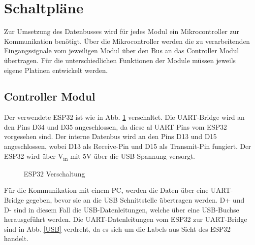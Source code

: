 \section{Schaltpläne}

Zur Umsetzung des Datenbusses wird für jedes Modul ein Mikrocontroller zur Kommunikation benötigt. 
Über die Mikrocontroller werden die zu verarbeitenden Eingangssignale vom jeweiligen Modul über den Bus an das Controller Modul übertragen. Für die 
unterschiedlichen Funktionen der Module müssen jeweils eigene Platinen entwickelt werden. 


\subsection{Controller Modul}
Der verwendete ESP32 ist wie in Abb. \ref{ESP} verschaltet. Die UART-Bridge wird an den Pins D34 und D35 angeschlossen, da diese al UART Pins vom ESP32 vorgesehen sind. Der interne Datenbus wird an den Pins D13 und D15 angeschlossen, wobei D13 als Receive-Pin und D15 als Transmit-Pin fungiert. Der ESP32 wird über V\textsubscript{in} mit 5V über die USB Spannung versorgt.

\begin{figure}[H]
    \centering    
    \caption{ESP32 Verschaltung}
    \label{ESP}
\end{figure}

Für die Kommunikation mit einem PC, werden die Daten über eine UART-Bridge gegeben, bevor sie an die USB Schnittstelle übertragen werden. D+ und D- sind in diesem Fall die USB-Datenleitungen, welche über eine USB-Buchse herausgeführt werden. Die UART-Datenleitungen vom ESP32 zur UART-Bridge sind in Abb. \ref{USB} verdreht, da es sich um die Labels aus Sicht des ESP32 handelt.


